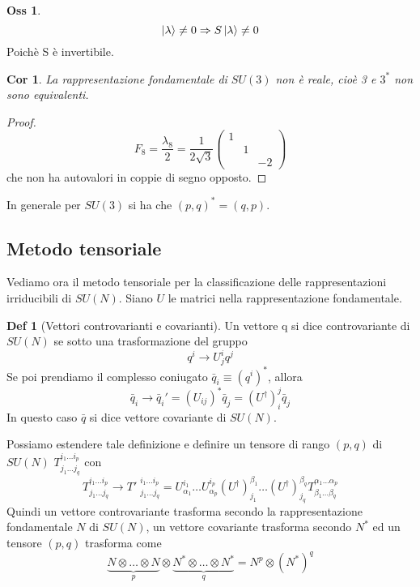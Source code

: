 \documentclass[10pt,a4paper]{article}
\newtheorem{cor}{Cor}[section]
\theoremstyle{definition}
\newtheorem{definition}{Def}[section]
\newtheorem{observation}{Oss}[section]
\begin{document}
\begin{observation}
    \[
    \ket{\lambda} \neq 0 \Rightarrow S\ket{\lambda} \neq 0   
    \]
    Poichè S è invertibile.
\end{observation}

\begin{cor}
    La rappresentazione fondamentale di $SU(3)$ non è reale, cioè 3 e $3^*$ non sono equivalenti.

\end{cor}

\begin{proof}
    \[
    F_8 = \frac{\lambda_8}{2} = \frac{1}{2\sqrt{3}}
    \begin{pmatrix}
        1 & & \\
        & 1 & \\
        & & -2
    \end{pmatrix}    
    \]
    che non ha autovalori in coppie di segno opposto.

\end{proof}

In generale per $SU(3)$ si ha che $(p,q)^* = (q, p)$.

\subsection{Metodo tensoriale}
Vediamo ora il metodo tensoriale per la classificazione delle rappresentazioni irriducibili di $SU(N)$. Siano $U$ le matrici nella rappresentazione fondamentale.

\begin{definition}[Vettori controvarianti e covarianti]
    Un vettore q si dice controvariante di $SU(N)$ se sotto una trasformazione del gruppo 
    \[
    q^i \to U^i_j q^j    
    \]
    Se poi prendiamo il complesso coniugato $\bar{q}_i \equiv (q^i)^*$, allora
    \[
    \bar{q}_i \to \bar{q}_i' = (U_{ij})^* \bar{q}_j = (U^\dagger)_i^j \bar{q}_j    
    \]
    In questo caso $\bar{q}$ si dice vettore covariante di $SU(N)$.
\end{definition}

Possiamo estendere tale definizione e definire un tensore di rango $(p, q)$ di $SU(N)$ \(T_{j_1 \dots j_q}^{i_1 \dots i_p}\) con 
\[    
    T_{j_1 \dots j_q}^{i_1 \dots i_p} \to T'\phantom{.}_{j_1 \dots j_q}^{i_1 \dots i_p} = U_{\alpha_1}^{i_1}\dots U_{\alpha_p}^{i_p} (U^\dagger)_{j_1}^{\beta_1} \dots (U^\dagger)_{j_q}^{\beta_q} T_{\beta_1 \dots \beta_q}^{\alpha_1 \dots \alpha_p}
\] 
Quindi un vettore controvariante trasforma secondo la rappresentazione fondamentale $N$ di $SU(N)$, un vettore covariante trasforma secondo $N^*$ ed un tensore $(p, q)$ trasforma come \[\underbrace{N \otimes \dots \otimes N}_{p}\otimes \underbrace{N^* \otimes \dots \otimes N^*}_{q} = N^p \otimes (N^*)^q\]
\end{document}
